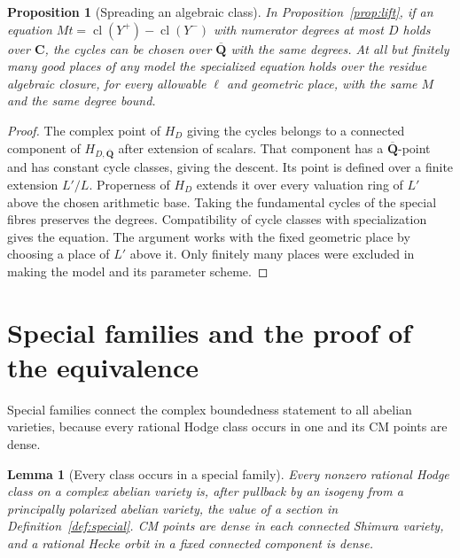 \documentclass[11pt]{article}
\newtheorem{proposition}[theorem]{Proposition}
\newtheorem{lemma}[theorem]{Lemma}
\theoremstyle{definition}
\theoremstyle{remark}
\newcommand{\C}{\mathbf C}
\newcommand{\Qbar}{\overline{\mathbf Q}}
\newcommand{\cl}{\operatorname{cl}}
\begin{document}
\begin{proposition}[Spreading an algebraic class]\label{prop:spread}
In Proposition~\ref{prop:lift}, if an equation $Mt=\cl(Y^+)-\cl(Y^-)$ with numerator degrees at most $D$ holds over $\C$, the cycles can be chosen over $\Qbar$ with the same degrees. At all but finitely many good places of any model the specialized equation holds over the residue algebraic closure, for every allowable $\ell$ and geometric place, with the same $M$ and the same degree bound.
\end{proposition}

\begin{proof}
The complex point of $H_D$ giving the cycles belongs to a connected component of $H_{D,\Qbar}$ after extension of scalars. That component has a $\Qbar$-point and has constant cycle classes, giving the descent. Its point is defined over a finite extension $L'/L$. Properness of $H_D$ extends it over every valuation ring of $L'$ above the chosen arithmetic base. Taking the fundamental cycles of the special fibres preserves the degrees. Compatibility of cycle classes with specialization gives the equation. The argument works with the fixed geometric place by choosing a place of $L'$ above it. Only finitely many places were excluded in making the model and its parameter scheme.
\end{proof}

\section{Special families and the proof of the equivalence}
\label{sec:shimura}

Special families connect the complex boundedness statement to all abelian varieties, because every rational Hodge class occurs in one and its CM points are dense.

\begin{lemma}[Every class occurs in a special family]\label{lem:shimura}
Every nonzero rational Hodge class on a complex abelian variety is, after pullback by an isogeny from a principally polarized abelian variety, the value of a section in Definition~\ref{def:special}. CM points are dense in each connected Shimura variety, and a rational Hecke orbit in a fixed connected component is dense.
\end{lemma}
\end{document}

